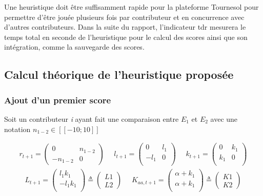 Une heuristique doit être suffisamment rapide pour la plateforme Tournesol pour permettre d'être jouée plusieurs fois par contributeur et en concurrence avec d'autres contributeurs.
Dans la suite du rapport, l'indicateur \acrfull{tdr} mesurera le temps total en seconde de l'heuristique pour le calcul des scores ainsi que son intégration, comme la sauvegarde des scores.

\subsection{Calcul théorique de l'heuristique proposée}\label{sub:theorie}

\subsubsection{Ajout d'un premier score}

Soit un contributeur \textit{i} ayant fait une comparaison entre $E_{1}$ et $E_{2}$ avec une notation $n_{1-2} \in [\![-10;10]\!]$

\begin{align*}
r_{t+1}= \begin{pmatrix}
0 & n_{1-2} \\
-n_{1-2} & 0 
\end{pmatrix}
~~~~~~
l_{t+1}= \begin{pmatrix}
0 & l_1 \\
-l_1 & 0 \\
\end{pmatrix}
~~~~~~
k_{t+1}= \begin{pmatrix}
0 & k_1 \\
k_1 & 0 \\
\end{pmatrix}
\end{align*}
\begin{align*}
L_{t+1}= \begin{pmatrix}
l_1 k_1\\
-l_1 k_1 \\
\end{pmatrix} \triangleq
\begin{pmatrix}
L1\\
L2
\end{pmatrix}
~~~~~~
K_{aa,t+1}= \begin{pmatrix}
\alpha + k_1\\
\alpha +  k_1\\
\end{pmatrix} \triangleq
\begin{pmatrix}
K1\\
K2
\end{pmatrix} 
\end{align*}

